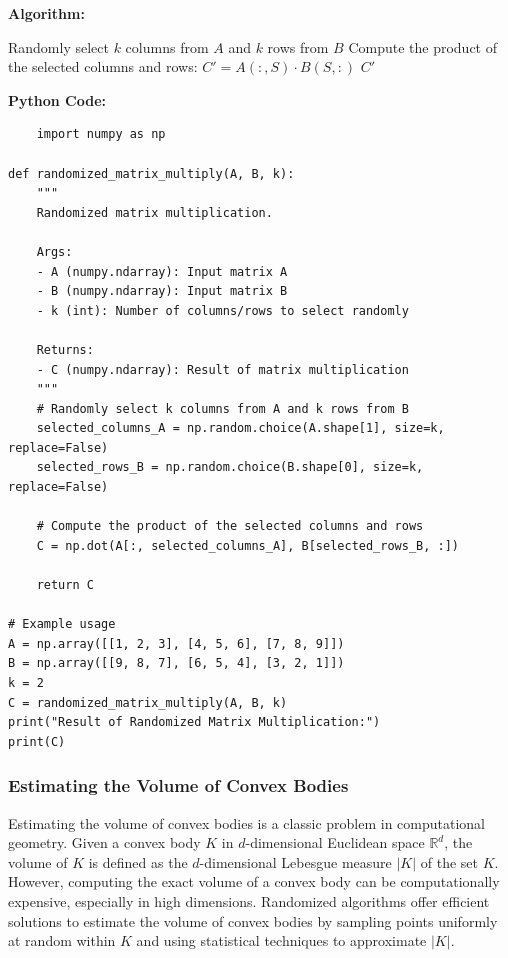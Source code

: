 \documentclass[12pt]{book} %
\begin{document}
\textbf{Algorithm:}
\FloatBarrier
\begin{algorithm}[H]
\caption{Randomized Matrix Multiplication}
\begin{algorithmic}[1]
    \State Randomly select \(k\) columns from \(A\) and \(k\) rows from \(B\)
    \State Compute the product of the selected columns and rows: \(C' = A(:, S) \cdot B(S, :)\)
    \State \Return \(C'\)
\EndProcedure
\end{algorithmic}
\end{algorithm}
\FloatBarrier
\textbf{Python Code:}
\FloatBarrier
\begin{lstlisting}
    import numpy as np

def randomized_matrix_multiply(A, B, k):
    """
    Randomized matrix multiplication.

    Args:
    - A (numpy.ndarray): Input matrix A
    - B (numpy.ndarray): Input matrix B
    - k (int): Number of columns/rows to select randomly

    Returns:
    - C (numpy.ndarray): Result of matrix multiplication
    """
    # Randomly select k columns from A and k rows from B
    selected_columns_A = np.random.choice(A.shape[1], size=k, replace=False)
    selected_rows_B = np.random.choice(B.shape[0], size=k, replace=False)

    # Compute the product of the selected columns and rows
    C = np.dot(A[:, selected_columns_A], B[selected_rows_B, :])

    return C

# Example usage
A = np.array([[1, 2, 3], [4, 5, 6], [7, 8, 9]])
B = np.array([[9, 8, 7], [6, 5, 4], [3, 2, 1]])
k = 2
C = randomized_matrix_multiply(A, B, k)
print("Result of Randomized Matrix Multiplication:")
print(C)
\end{lstlisting}

\subsubsection{Estimating the Volume of Convex Bodies}
Estimating the volume of convex bodies is a classic problem in computational geometry. Given a convex body \(K\) in \(d\)-dimensional Euclidean space \(\mathbb{R}^d\), the volume of \(K\) is defined as the \(d\)-dimensional Lebesgue measure \(|K|\) of the set \(K\). However, computing the exact volume of a convex body can be computationally expensive, especially in high dimensions. Randomized algorithms offer efficient solutions to estimate the volume of convex bodies by sampling points uniformly at random within \(K\) and using statistical techniques to approximate \(|K|\).
\end{document}
